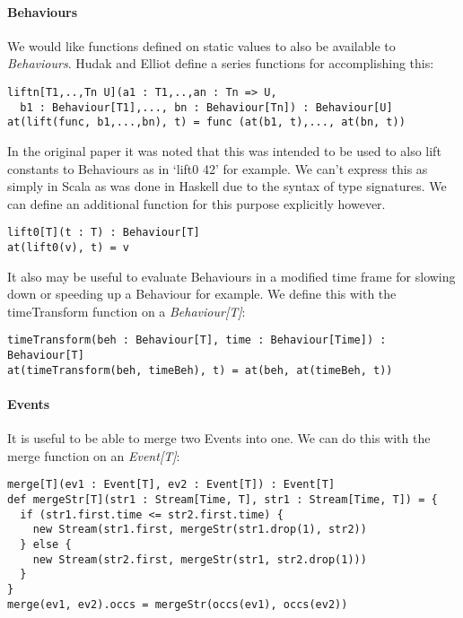 \documentclass[12pt]{article}
\begin{document}
        \paragraph{Behaviours}
          We would like functions defined on static values to also be available to \emph{Behaviours}. Hudak
          and Elliot define a series functions for accomplishing this:
          
\begin{verbatim}
liftn[T1,..,Tn U](a1 : T1,..,an : Tn => U, 
  b1 : Behaviour[T1],..., bn : Behaviour[Tn]) : Behaviour[U]
at(lift(func, b1,...,bn), t) = func (at(b1, t),..., at(bn, t))
\end{verbatim}

        In the original paper it was noted that this was intended to be used to also lift constants to Behaviours
        as in `lift0 42' for example. We can't express this as simply in Scala as was done in Haskell due to 
        the syntax of type signatures. We can define an additional function for this purpose explicitly however.

\begin{verbatim}
lift0[T](t : T) : Behaviour[T]
at(lift0(v), t) = v
\end{verbatim}
          
         It also may be useful to evaluate Behaviours in a modified time frame for slowing down or speeding
         up a Behaviour for example. We define this with the timeTransform function on a \emph{Behaviour[T]}:

\begin{verbatim}
timeTransform(beh : Behaviour[T], time : Behaviour[Time]) : Behaviour[T]
at(timeTransform(beh, timeBeh), t) = at(beh, at(timeBeh, t))
\end{verbatim}
          
        \paragraph{Events}
          It is useful to be able to merge two Events into one. We can do this with the merge function on an \emph{Event[T]}:
  
\begin{verbatim}
merge[T](ev1 : Event[T], ev2 : Event[T]) : Event[T]
def mergeStr[T](str1 : Stream[Time, T], str1 : Stream[Time, T]) = {
  if (str1.first.time <= str2.first.time) {
    new Stream(str1.first, mergeStr(str1.drop(1), str2))
  } else {
    new Stream(str2.first, mergeStr(str1, str2.drop(1)))
  }
}
merge(ev1, ev2).occs = mergeStr(occs(ev1), occs(ev2))
\end{verbatim}            
\end{document}
